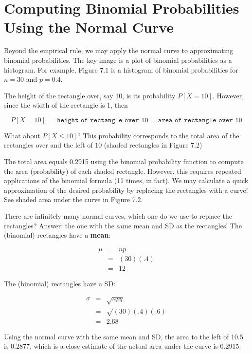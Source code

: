 \documentclass[11pt]{book}\usepackage[]{graphicx}\usepackage[]{color}
\begin{document}
\section{Computing Binomial Probabilities Using the Normal Curve}

Beyond the empirical rule, we may apply the normal curve to approximating binomial probabilities.  The key image is a plot of binomial probabilities as a histogram.  For example, Figure 7.1 is a histogram of binomial probabilities for $n = 30$ and $p = 0.4$.

The height of the rectangle over, say 10, is its probability $P[X = 10]$.  However, since the width of the rectangle is 1, then

\begin{equation*}
P[X = 10] = \texttt{ height of rectangle over 10 = area of rectangle over 10}
\end{equation*}

What about $P[X \le 10]$?  This probability corresponds to the total area of the rectangles over and the left of 10 (shaded rectangles in Figure 7.2)

The total area equals 0.2915 using the binomial probability function to compute the area (probability) of each shaded rectangle.  However, this requires repeated applications of the binomial formula (11 times, in fact).  We may calculate a quick approximation of the desired probability by replacing the rectangles with a curve!  See shaded area under the curve in Figure 7.2.

There are infinitely many normal curves, which one do we use to replace the rectangles?  Answer: the one with the same mean and SD as the rectangles!  The (binomial) rectangles have a \textbf{mean}:

\begin{eqnarray*}
\mu &=& np \\
  &=& (30)(.4) \\
  &=& 12
\end{eqnarray*}

The (binomial) rectangles have a SD:

\begin{eqnarray*}
\sigma &=& \sqrt{npq} \\
  &=& \sqrt{(30)(.4)(.6)} \\
  &=& 2.68
\end{eqnarray*}

Using the normal curve with the same mean and SD, the area to the left of 10.5 is 0.2877, which is a close estimate of the actual area under the curve is 0.2915.
\end{document}
